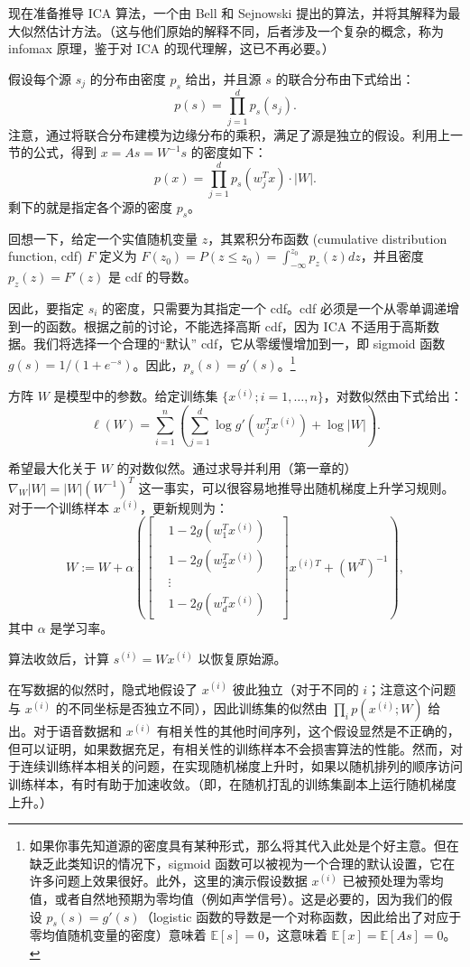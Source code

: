 现在准备推导 ICA 算法，一个由 Bell 和 Sejnowski 提出的算法，并将其解释为最大似然估计方法。（这与他们原始的解释不同，后者涉及一个复杂的概念，称为 infomax 原理，鉴于对 ICA 的现代理解，这已不再必要。）

假设每个源 $s_j$ 的分布由密度 $p_s$ 给出，并且源 $s$ 的联合分布由下式给出：
\[
    p(s) = \prod_{j=1}^d p_s(s_j).
\]
注意，通过将联合分布建模为边缘分布的乘积，满足了源是独立的假设。利用上一节的公式，得到 $x = As = W^{-1}s$ 的密度如下：
\[
    p(x) = \prod_{j=1}^d p_s(w_j^T x) \cdot |W|.
\]
剩下的就是指定各个源的密度 $p_s$。

回想一下，给定一个实值随机变量 $z$，其累积分布函数 (cumulative distribution function, cdf) $F$ 定义为 $F(z_0) = P(z \le z_0) = \int_{-\infty}^{z_0} p_z(z)dz$，并且密度 $p_z(z) = F'(z)$ 是 cdf 的导数。

因此，要指定 $s_i$ 的密度，只需要为其指定一个 cdf。cdf 必须是一个从零单调递增到一的函数。根据之前的讨论，不能选择高斯 cdf，因为 ICA 不适用于高斯数据。我们将选择一个合理的“默认” cdf，它从零缓慢增加到一，即 sigmoid 函数 $g(s) = 1/(1 + e^{-s})$。因此，$p_s(s) = g'(s)$。\footnote{如果你事先知道源的密度具有某种形式，那么将其代入此处是个好主意。但在缺乏此类知识的情况下，sigmoid 函数可以被视为一个合理的默认设置，它在许多问题上效果很好。此外，这里的演示假设数据 $x^{(i)}$ 已被预处理为零均值，或者自然地预期为零均值（例如声学信号）。这是必要的，因为我们的假设 $p_s(s) = g'(s)$（logistic 函数的导数是一个对称函数，因此给出了对应于零均值随机变量的密度）意味着 $\mathbb{E}[s] = 0$，这意味着 $\mathbb{E}[x] = \mathbb{E}[As] = 0$。}

方阵 $W$ 是模型中的参数。给定训练集 $\{x^{(i)}; i=1, \dots, n\}$，对数似然由下式给出：
\[
    \ell(W) = \sum_{i=1}^n \left( \sum_{j=1}^d \log g'(w_j^T x^{(i)}) + \log |W| \right).
\]

希望最大化关于 $W$ 的对数似然。通过求导并利用（第一章的）$\nabla_W |W| = |W|(W^{-1})^T$ 这一事实，可以很容易地推导出随机梯度上升学习规则。对于一个训练样本 $x^{(i)}$，更新规则为：
\[
    W := W + \alpha \left( 
        \begin{bmatrix} 
            & 1 - 2g(w_1^T x^{(i)}) & \\ 
            & 1 - 2g(w_2^T x^{(i)}) & \\ 
            & \vdots & \\ 
            & 1 - 2g(w_d^T x^{(i)}) & 
        \end{bmatrix} x^{(i)T}
        + (W^T)^{-1} 
    \right),
\]
其中 $\alpha$ 是学习率。

算法收敛后，计算 $s^{(i)} = Wx^{(i)}$ 以恢复原始源。

\begin{remark*}
    在写数据的似然时，隐式地假设了 $x^{(i)}$ 彼此独立（对于不同的 $i$；注意这个问题与 $x^{(i)}$ 的不同坐标是否独立不同），因此训练集的似然由 $\prod_i p(x^{(i)}; W)$ 给出。对于语音数据和 $x^{(i)}$ 有相关性的其他时间序列，这个假设显然是不正确的，但可以证明，如果数据充足，有相关性的训练样本不会损害算法的性能。然而，对于连续训练样本相关的问题，在实现随机梯度上升时，如果以随机排列的顺序访问训练样本，有时有助于加速收敛。（即，在随机打乱的训练集副本上运行随机梯度上升。）
\end{remark*}